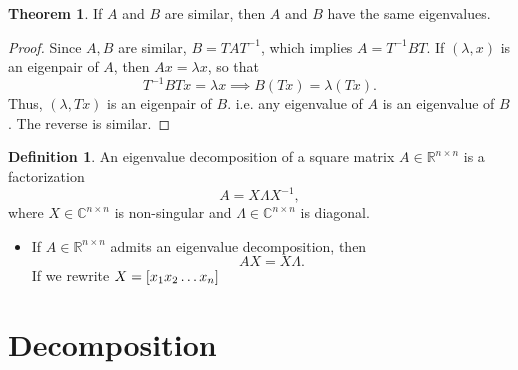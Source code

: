 \documentclass[12pt]{article}
\theoremstyle{definition}
\newtheorem{theorem}{Theorem}
\newtheorem{definition}{Definition}
\newcommand{\R}{\mathbb{R}}
\newcommand{\C}{\mathbb{C}}
\begin{document}
\begin{theorem}
		If $A$ and $B$ are similar, then $A$ and $B$ have the same eigenvalues.
\end{theorem}
\begin{proof}
		Since $A,B$ are similar, $B=TAT^{-1}$, which implies $A=T^{-1}BT$. If $\left( \lambda, x \right) $ is an eigenpair of $A$, then $Ax=\lambda x$, so that \[
				T^{-1}BTx=\lambda x\implies B\left( Tx \right) =\lambda\left( Tx \right) 
		.\] Thus, $\left( \lambda, Tx \right) $ is an eigenpair of $B$. i.e. any eigenvalue of $A$ is an eigenvalue of $B$. The reverse is similar.
\end{proof}
\begin{definition}
		An eigenvalue decomposition of a square matrix $A\in \R^{n\times n}$ is a factorization \[
		A=X\Lambda X^{-1}
		,\] where $X\in\C^{n\times n}$ is non-singular and $\Lambda\in\C^{n\times n}$ is diagonal.
\end{definition}
\begin{itemize}
		\item If $A\in \R^{n\times n}$ admits an eigenvalue decomposition, then \[
		AX=X\Lambda
.\] If we rewrite $X=[x_1\space x_2\space \ldots\space x_n]$
\end{itemize}
\newpage
\section{ Decomposition}
\end{document}
